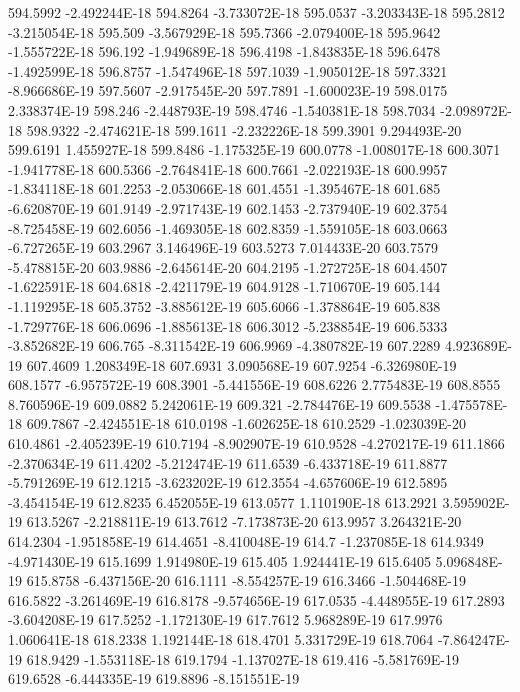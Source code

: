 594.5992  -2.492244E-18
594.8264  -3.733072E-18
595.0537  -3.203343E-18
595.2812  -3.215054E-18
595.509  -3.567929E-18
595.7366  -2.079400E-18
595.9642  -1.555722E-18
596.192  -1.949689E-18
596.4198  -1.843835E-18
596.6478  -1.492599E-18
596.8757  -1.547496E-18
597.1039  -1.905012E-18
597.3321  -8.966686E-19
597.5607  -2.917545E-20
597.7891  -1.600023E-19
598.0175  2.338374E-19
598.246  -2.448793E-19
598.4746  -1.540381E-18
598.7034  -2.098972E-18
598.9322  -2.474621E-18
599.1611  -2.232226E-18
599.3901  9.294493E-20
599.6191  1.455927E-18
599.8486  -1.175325E-19
600.0778  -1.008017E-18
600.3071  -1.941778E-18
600.5366  -2.764841E-18
600.7661  -2.022193E-18
600.9957  -1.834118E-18
601.2253  -2.053066E-18
601.4551  -1.395467E-18
601.685  -6.620870E-19
601.9149  -2.971743E-19
602.1453  -2.737940E-19
602.3754  -8.725458E-19
602.6056  -1.469305E-18
602.8359  -1.559105E-18
603.0663  -6.727265E-19
603.2967  3.146496E-19
603.5273  7.014433E-20
603.7579  -5.478815E-20
603.9886  -2.645614E-20
604.2195  -1.272725E-18
604.4507  -1.622591E-18
604.6818  -2.421179E-19
604.9128  -1.710670E-19
605.144  -1.119295E-18
605.3752  -3.885612E-19
605.6066  -1.378864E-19
605.838  -1.729776E-18
606.0696  -1.885613E-18
606.3012  -5.238854E-19
606.5333  -3.852682E-19
606.765  -8.311542E-19
606.9969  -4.380782E-19
607.2289  4.923689E-19
607.4609  1.208349E-18
607.6931  3.090568E-19
607.9254  -6.326980E-19
608.1577  -6.957572E-19
608.3901  -5.441556E-19
608.6226  2.775483E-19
608.8555  8.760596E-19
609.0882  5.242061E-19
609.321  -2.784476E-19
609.5538  -1.475578E-18
609.7867  -2.424551E-18
610.0198  -1.602625E-18
610.2529  -1.023039E-20
610.4861  -2.405239E-19
610.7194  -8.902907E-19
610.9528  -4.270217E-19
611.1866  -2.370634E-19
611.4202  -5.212474E-19
611.6539  -6.433718E-19
611.8877  -5.791269E-19
612.1215  -3.623202E-19
612.3554  -4.657606E-19
612.5895  -3.454154E-19
612.8235  6.452055E-19
613.0577  1.110190E-18
613.2921  3.595902E-19
613.5267  -2.218811E-19
613.7612  -7.173873E-20
613.9957  3.264321E-20
614.2304  -1.951858E-19
614.4651  -8.410048E-19
614.7  -1.237085E-18
614.9349  -4.971430E-19
615.1699  1.914980E-19
615.405  1.924441E-19
615.6405  5.096848E-19
615.8758  -6.437156E-20
616.1111  -8.554257E-19
616.3466  -1.504468E-19
616.5822  -3.261469E-19
616.8178  -9.574656E-19
617.0535  -4.448955E-19
617.2893  -3.604208E-19
617.5252  -1.172130E-19
617.7612  5.968289E-19
617.9976  1.060641E-18
618.2338  1.192144E-18
618.4701  5.331729E-19
618.7064  -7.864247E-19
618.9429  -1.553118E-18
619.1794  -1.137027E-18
619.416  -5.581769E-19
619.6528  -6.444335E-19
619.8896  -8.151551E-19
